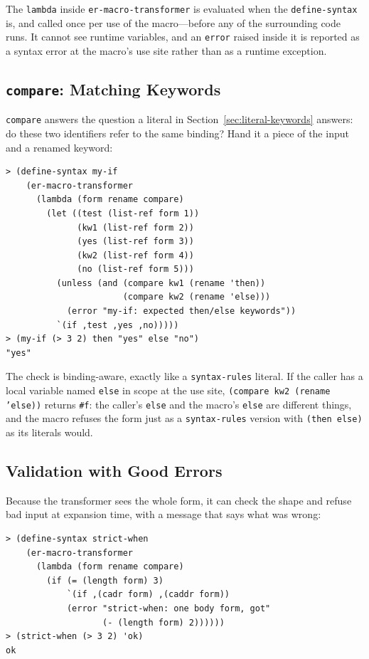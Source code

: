 \begin{note}
The \texttt{lambda} inside \texttt{er-macro-transformer} is evaluated when the \texttt{define-syntax} is, and called once per use of the macro---before any of the surrounding code runs. It cannot see runtime variables, and an \texttt{error} raised inside it is reported as a syntax error at the macro's use site rather than as a runtime exception.
\end{note}

\subsection{\texttt{compare}: Matching Keywords}

\texttt{compare} answers the question a literal in Section~\ref{sec:literal-keywords} answers: do these two identifiers refer to the same binding? Hand it a piece of the input and a renamed keyword:

\begin{lstlisting}[style=repl]
> (define-syntax my-if
    (er-macro-transformer
      (lambda (form rename compare)
        (let ((test (list-ref form 1))
              (kw1 (list-ref form 2))
              (yes (list-ref form 3))
              (kw2 (list-ref form 4))
              (no (list-ref form 5)))
          (unless (and (compare kw1 (rename 'then))
                       (compare kw2 (rename 'else)))
            (error "my-if: expected then/else keywords"))
          `(if ,test ,yes ,no)))))
> (my-if (> 3 2) then "yes" else "no")
"yes"
\end{lstlisting}

The check is binding-aware, exactly like a \texttt{syntax-rules} literal. If the caller has a local variable named \texttt{else} in scope at the use site, \texttt{(compare kw2 (rename 'else))} returns \texttt{\#f}: the caller's \texttt{else} and the macro's \texttt{else} are different things, and the macro refuses the form just as a \texttt{syntax-rules} version with \texttt{(then else)} as its literals would.

\subsection{Validation with Good Errors}

Because the transformer sees the whole form, it can check the shape and refuse bad input at expansion time, with a message that says what was wrong:

\begin{lstlisting}[style=repl]
> (define-syntax strict-when
    (er-macro-transformer
      (lambda (form rename compare)
        (if (= (length form) 3)
            `(if ,(cadr form) ,(caddr form))
            (error "strict-when: one body form, got"
                   (- (length form) 2))))))
> (strict-when (> 3 2) 'ok)
ok
\end{lstlisting}

